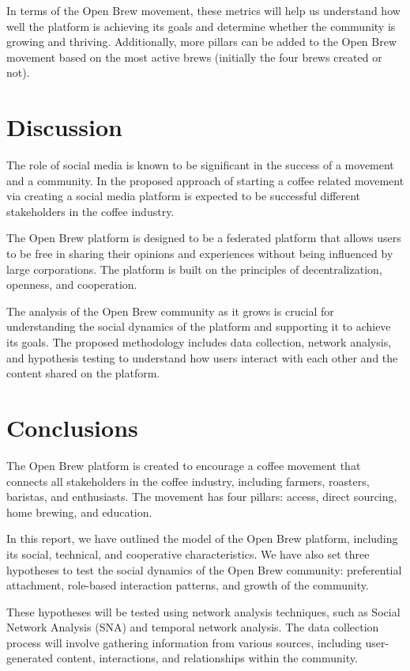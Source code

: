 \documentclass[12pt]{article}
\begin{document}
In terms of the Open Brew movement, these metrics will help us understand how well the platform is achieving its goals and determine whether the community is growing and thriving. Additionally, more pillars can be added to the Open Brew movement based on the most active brews (initially the four brews created or not).

\section{Discussion}
\label{section:discussion}
The role of social media is known to be significant in the success of a movement and a community. In the proposed approach of starting a coffee related movement via creating a social media platform is expected to be successful different stakeholders in the coffee industry.

The Open Brew platform is designed to be a federated platform that allows users to be free in sharing their opinions and experiences without being influenced by large corporations. The platform is built on the principles of decentralization, openness, and cooperation.

The analysis of the Open Brew community as it grows is crucial for understanding the social dynamics of the platform and supporting it to achieve its goals. The proposed methodology includes data collection, network analysis, and hypothesis testing to understand how users interact with each other and the content shared on the platform.

\section{Conclusions}
\label{section:conclusions}
The Open Brew platform is created to encourage a coffee movement that connects all stakeholders in the coffee industry, including farmers, roasters, baristas, and enthusiasts. The movement has four pillars: access, direct sourcing, home brewing, and education.

In this report, we have outlined the model of the Open Brew platform, including its social, technical, and cooperative characteristics. We have also set three hypotheses to test the social dynamics of the Open Brew community: preferential attachment, role-based interaction patterns, and growth of the community.

These hypotheses will be tested using network analysis techniques, such as Social Network Analysis (SNA) and temporal network analysis. The data collection process will involve gathering information from various sources, including user-generated content, interactions, and relationships within the community.
\end{document}
